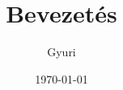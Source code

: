 \documentclass{article}
\begin{document}
\title{Bevezetés}
\author{Gyuri}
\date{\today}

\maketitle
\end{document}
